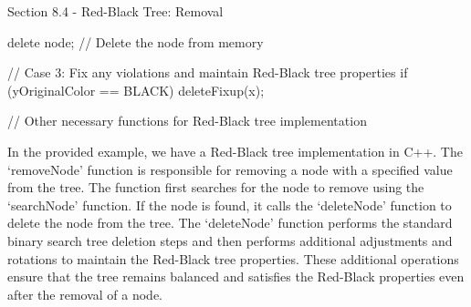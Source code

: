 \begin{notes}{Section 8.4 - Red-Black Tree: Removal}
\begin{highlight}
\begin{code}[C++]
{        delete node; // Delete the node from memory
    
        // Case 3: Fix any violations and maintain Red-Black tree properties
        if (yOriginalColor == BLACK) {
            deleteFixup(x);
        }
    }
    
    // Other necessary functions for Red-Black tree implementation
    \end{code}
        In the provided example, we have a Red-Black tree implementation in C++. The `removeNode' function is responsible for removing a node with a specified value from the tree. The function first searches for the node to remove using the `searchNode' function. If the node is found, it calls the `deleteNode' function to delete 
        the node from the tree. The `deleteNode' function performs the standard binary search tree deletion steps and then performs additional adjustments and rotations to maintain the Red-Black tree properties. These additional operations ensure that the tree remains balanced and satisfies the Red-Black properties even after the removal of a node.
    \end{highlight}    
\end{notes}
